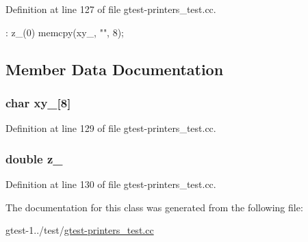 \-Definition at line 127 of file gtest-\/printers\-\_\-test.\-cc.


\begin{DoxyCode}
: z_(0) { memcpy(xy_, "\xEF{}\xAB{}", 8); }
\end{DoxyCode}


\subsection{\-Member \-Data \-Documentation}
\hypertarget{classfoo_1_1UnprintableInFoo_a02f1749d74933328d37d4924c6781e9c}{
\subsubsection[{xy\-\_\-}]{\setlength{\rightskip}{0pt plus 5cm}char {\bf xy\-\_\-}\mbox{[}8\mbox{]}}}\label{db/d08/classfoo_1_1UnprintableInFoo_a02f1749d74933328d37d4924c6781e9c}


\-Definition at line 129 of file gtest-\/printers\-\_\-test.\-cc.

\hypertarget{classfoo_1_1UnprintableInFoo_aba37cf6f1a87be3ea41680c1786a71a1}{
\subsubsection[{z\-\_\-}]{\setlength{\rightskip}{0pt plus 5cm}double {\bf z\-\_\-}}}\label{db/d08/classfoo_1_1UnprintableInFoo_aba37cf6f1a87be3ea41680c1786a71a1}


\-Definition at line 130 of file gtest-\/printers\-\_\-test.\-cc.



\-The documentation for this class was generated from the following file\-:\begin{DoxyCompactItemize}
\item 
gtest-\/1../test/\hyperlink{gtest-printers__test_8cc}{gtest-\/printers\-\_\-test.\-cc}\end{DoxyCompactItemize}
